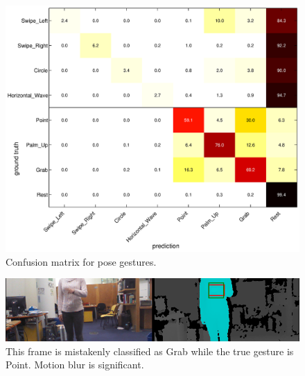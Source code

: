 \begin{figure}[tbh]
\centering
\includegraphics[trim=7cm 4cm 9cm 9.8cm,
clip, width=\linewidth]{figures/pose_confusion.eps}
\caption{Confusion matrix for pose gestures.}
\label{fig:pose-confusion}
\end{figure}

\begin{figure}[tbh]
\centering
\includegraphics[width=\linewidth]{figures/point_posture_full_image.png}
\caption{This frame is mistakenly classified as Grab while the true gesture
is Point. Motion blur is significant.}
\label{fig:point_grab}
\end{figure}